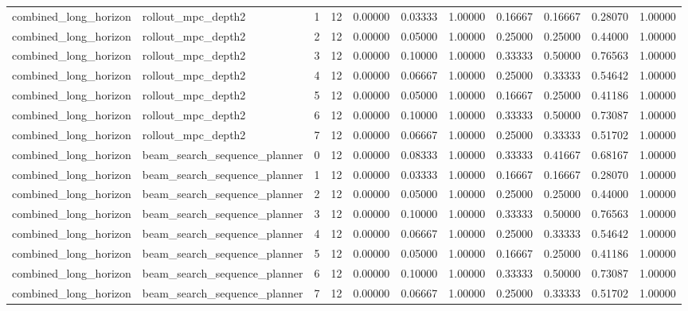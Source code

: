 \documentclass{article}
\begin{document}
\begin{table}[tbp]
{\begin{tabular}{lllllllllll}
combined\_long\_horizon & rollout\_mpc\_depth2 & 1 & 12 & 0.00000 & 0.03333 & 1.00000 & 0.16667 & 0.16667 & 0.28070 & 1.00000 \\
combined\_long\_horizon & rollout\_mpc\_depth2 & 2 & 12 & 0.00000 & 0.05000 & 1.00000 & 0.25000 & 0.25000 & 0.44000 & 1.00000 \\
combined\_long\_horizon & rollout\_mpc\_depth2 & 3 & 12 & 0.00000 & 0.10000 & 1.00000 & 0.33333 & 0.50000 & 0.76563 & 1.00000 \\
combined\_long\_horizon & rollout\_mpc\_depth2 & 4 & 12 & 0.00000 & 0.06667 & 1.00000 & 0.25000 & 0.33333 & 0.54642 & 1.00000 \\
combined\_long\_horizon & rollout\_mpc\_depth2 & 5 & 12 & 0.00000 & 0.05000 & 1.00000 & 0.16667 & 0.25000 & 0.41186 & 1.00000 \\
combined\_long\_horizon & rollout\_mpc\_depth2 & 6 & 12 & 0.00000 & 0.10000 & 1.00000 & 0.33333 & 0.50000 & 0.73087 & 1.00000 \\
combined\_long\_horizon & rollout\_mpc\_depth2 & 7 & 12 & 0.00000 & 0.06667 & 1.00000 & 0.25000 & 0.33333 & 0.51702 & 1.00000 \\
combined\_long\_horizon & beam\_search\_sequence\_planner & 0 & 12 & 0.00000 & 0.08333 & 1.00000 & 0.33333 & 0.41667 & 0.68167 & 1.00000 \\
combined\_long\_horizon & beam\_search\_sequence\_planner & 1 & 12 & 0.00000 & 0.03333 & 1.00000 & 0.16667 & 0.16667 & 0.28070 & 1.00000 \\
combined\_long\_horizon & beam\_search\_sequence\_planner & 2 & 12 & 0.00000 & 0.05000 & 1.00000 & 0.25000 & 0.25000 & 0.44000 & 1.00000 \\
combined\_long\_horizon & beam\_search\_sequence\_planner & 3 & 12 & 0.00000 & 0.10000 & 1.00000 & 0.33333 & 0.50000 & 0.76563 & 1.00000 \\
combined\_long\_horizon & beam\_search\_sequence\_planner & 4 & 12 & 0.00000 & 0.06667 & 1.00000 & 0.25000 & 0.33333 & 0.54642 & 1.00000 \\
combined\_long\_horizon & beam\_search\_sequence\_planner & 5 & 12 & 0.00000 & 0.05000 & 1.00000 & 0.16667 & 0.25000 & 0.41186 & 1.00000 \\
combined\_long\_horizon & beam\_search\_sequence\_planner & 6 & 12 & 0.00000 & 0.10000 & 1.00000 & 0.33333 & 0.50000 & 0.73087 & 1.00000 \\
combined\_long\_horizon & beam\_search\_sequence\_planner & 7 & 12 & 0.00000 & 0.06667 & 1.00000 & 0.25000 & 0.33333 & 0.51702 & 1.00000 \\

\end{tabular}}
\end{table}
\end{document}
